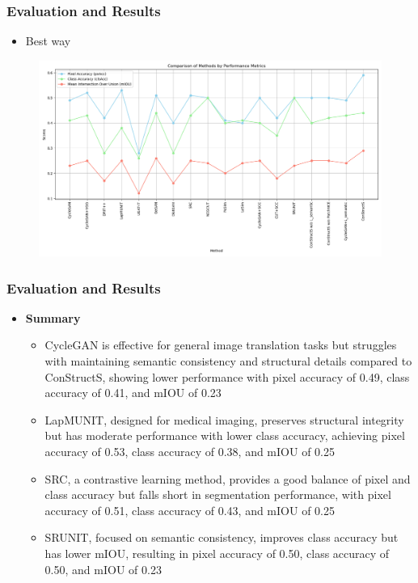 \documentclass[aspectratio=169, lecture, amberg]{OTHAWbeamer}
\begin{document}
\begin{frame}
    \frametitle{Evaluation and Results}
    \begin{itemize}
        \item Best way
    \end{itemize}
    \begin{figure}
        \centering
        \includegraphics[width=0.8\linewidth]{model_eval.png} 
        
    \end{figure}
\end{frame}

\begin{frame}
    \frametitle{Evaluation and Results}
    \begin{itemize}
        \item \textbf{Summary }
        \vspace{0.2cm}
        \begin{itemize}
            \item <1-> CycleGAN is effective for general image translation tasks but struggles with maintaining semantic consistency and structural details compared to ConStructS, showing lower performance with pixel accuracy of 0.49, class accuracy of 0.41, and mIOU of 0.23
            \vspace{0.1cm}
            \item <2-> LapMUNIT, designed for medical imaging, preserves structural integrity but has moderate performance with lower class accuracy, achieving pixel accuracy of 0.53, class accuracy of 0.38, and mIOU of 0.25
            \vspace{0.1cm} 
            \item <3-> SRC, a contrastive learning method, provides a good balance of pixel and class accuracy but falls short in segmentation performance, with pixel accuracy of 0.51, class accuracy of 0.43, and mIOU of 0.25
            \vspace{0.1cm}
            \item <4-> SRUNIT, focused on semantic consistency, improves class accuracy but has lower mIOU, resulting in pixel accuracy of 0.50, class accuracy of 0.50, and mIOU of 0.23
            \vspace{0.1cm}
        \end{itemize}
    \end{itemize}
    
\end{frame}
\end{document}
